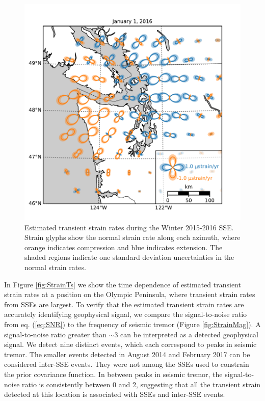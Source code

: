 \documentclass[extra,mreferee]{gji}
\begin{document}
\begin{figure}
\includegraphics{figures/strain_map/strain-map.pdf}
\caption{
Estimated transient strain rates during the Winter 2015-2016 SSE.
Strain glyphs show the normal strain rate along each azimuth, where
orange indicates compression and blue indicates extension. The shaded
regions indicate one standard deviation uncertainties in the normal
strain rates.
}   
\label{fig:StrainMap}
\end{figure}

In Figure \ref{fig:StrainTs} we show the time dependence of estimated
transient strain rates at a position on the Olympic Peninsula, where
transient strain rates from SSEs are largest. To verify that the
estimated transient strain rates are accurately identifying
geophysical signal, we compare the signal-to-noise ratio from eq.
(\ref{eq:SNR}) to the frequency of seismic tremor (Figure
\ref{fig:StrainMag}). A signal-to-noise ratio greater than ${\sim}3$
can be interpreted as a detected geophysical signal. We detect nine
distinct events, which each correspond to peaks in seismic tremor. The
smaller events detected in August 2014 and February 2017 can be
considered inter-SSE events. They were not among the SSEs used to
constrain the prior covariance function. In between peaks in seismic
tremor, the signal-to-noise ratio is consistently between 0 and 2,
suggesting that all the transient strain detected at this location is
associated with SSEs and inter-SSE events.
\end{document}
